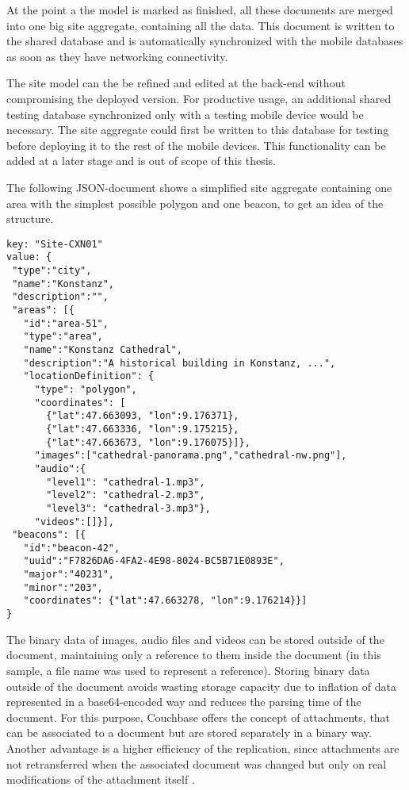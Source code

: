 At the point a the model is marked as finished, all these documents are merged into one big site aggregate, containing all the data. This document is written to the shared database and is automatically synchronized with the mobile databases as soon as they have networking connectivity. 

The site model can the be refined and edited at the back-end without compromising the deployed version. For productive usage, an additional shared testing database synchronized only with a testing mobile device would be necessary. The site aggregate could first be written to this database for testing before deploying it to the rest of the mobile devices. This functionality can be added at a later stage and is out of scope of this thesis.
 
The following JSON-document shows a simplified site aggregate containing one area with the simplest possible polygon and one beacon, to get an idea of the structure.

\begin{lstlisting}
key: "Site-CXN01"
value: {
 "type":"city",
 "name":"Konstanz",
 "description":"",
 "areas": [{
   "id":"area-51",
   "type":"area",
   "name":"Konstanz Cathedral", 
   "description":"A historical building in Konstanz, ...",
   "locationDefinition": {
	 "type": "polygon",
	 "coordinates": [
	   {"lat":47.663093, "lon":9.176371},
	   {"lat":47.663336, "lon":9.175215},
	   {"lat":47.663673, "lon":9.176075}]}, 
	 "images":["cathedral-panorama.png","cathedral-nw.png"], 
	 "audio":{
	   "level1": "cathedral-1.mp3",
	   "level2": "cathedral-2.mp3",
	   "level3": "cathedral-3.mp3"}, 
	 "videos":[]}],
 "beacons": [{
   "id":"beacon-42",
   "uuid":"F7826DA6-4FA2-4E98-8024-BC5B71E0893E",
   "major":"40231",
   "minor":"203",
   "coordinates": {"lat":47.663278, "lon":9.176214}}]
}
\end{lstlisting}

The binary data of images, audio files and videos can be stored outside of the document, maintaining only a reference to them inside the document (in this sample, a file name was used to represent a reference). Storing binary data outside of the document avoids wasting storage capacity due to inflation of data represented in a base64-encoded way and reduces the parsing time of the document.
For this purpose, Couchbase offers the concept of attachments, that can be associated to a document but are stored separately in a binary way. Another advantage is a higher efficiency of the replication, since attachments are not retransferred when the associated document was changed but only on real modifications of the attachment itself \cite{cbattachment}.

